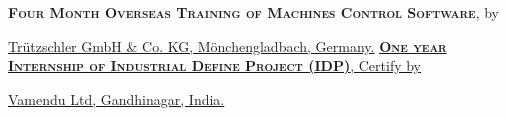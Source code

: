 \vspace*{-5mm}
\begin{rubric}{}
\entry*[2017-18] \textbf{\textsc{Four Month Overseas Training of Machines Control Software}}, by \par 
\href{https://www.truetzschler.de/}{Trützschler GmbH \& Co. KG, Mönchengladbach, Germany.}
\entry*[2012] 
\href{https://drive.google.com/file/d/1YYHnvkbPl-SUjRIzmZiyfUbNWm2az5vg/view?usp=sharing}
{\textbf{\textsc{One year Internship of Industrial Define Project (IDP)}}, Certify by} \par
\href{http://www.vamendu.com/}{Vamendu Ltd, Gandhinagar, India.}
\vspace*{-0.5mm}


\end{rubric}
